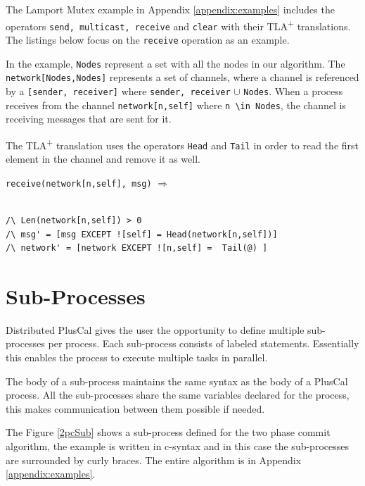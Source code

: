 \documentclass{thesul}
\newcommand{\tlaplus}{TLA\textsuperscript{+}\xspace}
\begin{document}
The Lamport Mutex example in Appendix \ref{appendix:examples} includes the operators \verb|send, multicast, receive| and \verb|clear| with their \tlaplus translations. The listings below focus on the \verb|receive| operation as an example.


In the example, \verb|Nodes| represent a set with all the nodes in our algorithm. The \verb|network[Nodes,Nodes]| represents a set of channels, where a channel is referenced by a \verb|[sender, receiver]| where \verb|sender, receiver| $\cup$ \verb|Nodes|. When a process receives from the channel \verb|network[n,self]| where \verb|n \in Nodes|, the channel is receiving messages that are sent for it.

The \tlaplus translation uses the operators \verb|Head| and \verb|Tail| in order to read the first element in the channel and remove it as well.

\begin{minipage}{.35\textwidth}

\lstinline!receive(network[n,self], msg)! $\Rightarrow$\\\\
\end{minipage}
\begin{minipage}{\textwidth}
\begin{lstlisting}[frame = none, numbers = none]
/\ Len(network[n,self]) > 0 
/\ msg' = [msg EXCEPT ![self] = Head(network[n,self])]
/\ network' = [network EXCEPT ![n,self] =  Tail(@) ]
\end{lstlisting}
\end{minipage}\hfill\hfill


\section{Sub-Processes}
\label{subProcess}

Distributed PlusCal gives the user the opportunity to define multiple sub-processes per process. Each sub-process consists of labeled statements. Essentially this enables the process to execute multiple tasks in parallel.

The body of a sub-process maintains the same syntax as the body of a PlusCal process. All the sub-processes share the same variables declared for the process, this makes communication between them possible if needed.

The Figure \ref{2pcSub} shows a sub-process defined for the two phase commit algorithm, the example is written in c-syntax and in this case the sub-processes are surrounded by curly braces.
The entire algorithm is in Appendix \ref{appendix:examples}.
\end{document}

